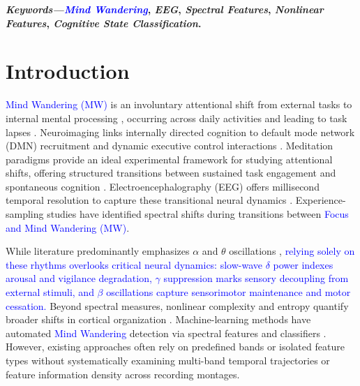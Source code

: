 \documentclass[conference]{IEEEtran}
\begin{document}
\textbf{\textit{Keywords---}\textit{\textcolor{blue}{Mind Wandering}}, \textit{EEG}, \textit{Spectral Features}, \textit{Nonlinear Features}, \textit{Cognitive State Classification}.}

\section{Introduction}

\textcolor{blue}{Mind Wandering (MW)} is an involuntary attentional shift from external tasks to internal mental processing \cite{smallwood2013restless}, occurring across daily activities and leading to task lapses \cite{killingsworth2010wandering}. Neuroimaging links internally directed cognition to default mode network (DMN) recruitment \cite{raichle2001default} and dynamic executive control interactions \cite{christoff2016mind}. Meditation paradigms provide an ideal experimental framework for studying attentional shifts, offering structured transitions between sustained task engagement and spontaneous cognition \cite{lutz2008attention,tang2015neuroscience,cahn2013meditation}. Electroencephalography (EEG) offers millisecond temporal resolution to capture these transitional neural dynamics \cite{KAM2022119372}. Experience-sampling studies have identified spectral shifts during transitions between \textcolor{blue}{Focus and Mind Wandering (MW)}.

While literature predominantly emphasizes $\alpha$ and $\theta$ oscillations \cite{KAM2022119372}, \textcolor{blue}{relying solely on these rhythms overlooks critical neural dynamics: slow-wave $\delta$ power indexes arousal and vigilance degradation, $\gamma$ suppression marks sensory decoupling from external stimuli, and $\beta$ oscillations capture sensorimotor maintenance and motor cessation.} Beyond spectral measures, nonlinear complexity and entropy quantify broader shifts in cortical organization \cite{lu2022nonlinear,berkovich2012mindfulness}. Machine-learning methods have automated \textcolor{blue}{Mind Wandering} detection via spectral features and classifiers \cite{jin2020distinguishing,compton2019wandering,hosseini2019deep}. However, existing approaches often rely on predefined bands or isolated feature types without systematically examining multi-band temporal trajectories or feature information density across recording montages.
\end{document}
